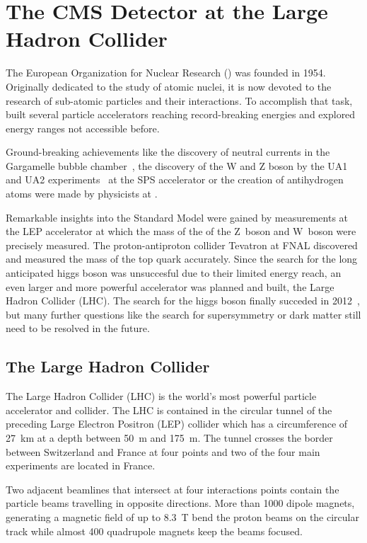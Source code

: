 
\chapter{The CMS Detector at the Large Hadron Collider}

The European Organization for Nuclear Research (\CERN) was founded in 1954.
Originally dedicated to the study of atomic nuclei, it is now devoted to the
research of sub-atomic particles and their interactions. To accomplish that
task, \CERN built several particle accelerators reaching record-breaking
energies and explored energy ranges not accessible before.

Ground-breaking achievements like the discovery of neutral currents in the
Gargamelle bubble chamber~\cite{Hasert:1973ff}, the discovery of the W and Z
boson by the UA1 and UA2 experiments~\cite{Arnison:1983rp} at the SPS
accelerator or the creation of antihydrogen atoms were made by physicists at
\CERN.

Remarkable insights into the Standard Model were gained by measurements at the
LEP accelerator at which the mass of the of the Z~boson and W~boson were
precisely measured. The proton-antiproton collider Tevatron at FNAL discovered
and measured the mass of the top quark accurately. Since the search for the long
anticipated higgs boson was unsuccesful due to their limited energy reach, an even
larger and more powerful accelerator was planned and built, the Large Hadron
Collider (LHC). The search for the higgs boson finally succeded in
2012~\cite{Chatrchyan:2012xdj}, but many further questions like the search for
supersymmetry or dark matter still need to be resolved in the future.

\section{The Large Hadron Collider}

The Large Hadron Collider (LHC) is the world's most powerful particle
accelerator and collider. The LHC is contained in the circular tunnel of the
preceding Large Electron Positron (LEP) collider which has a circumference of
\SI{27}{\kilo \meter} at a depth between \SI{50}{\meter} and \SI{175}{\meter}.
The tunnel crosses the border between Switzerland and France at four points and
two of the four main experiments are located in France. 

Two adjacent beamlines that intersect at four interactions points contain the
particle beams travelling in opposite directions. More than 1000 dipole magnets,
generating a magnetic field of up to \SI{8.3}{\tesla} bend the proton beams on
the circular track while almost 400 quadrupole magnets keep the beams focused. 

